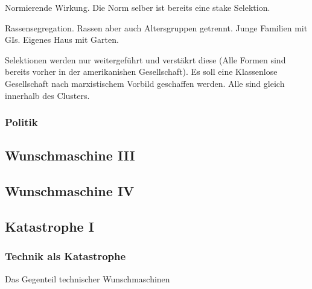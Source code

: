 \documentclass[a4paper,ngerman,11pt]{scrartcl}
\begin{document}
Normierende Wirkung. Die Norm selber ist bereits eine stake Selektion.

Rassensegregation. Rassen aber auch Altersgruppen getrennt. Junge Familien
mit GIs. Eigenes Haus mit Garten.

Selektionen werden nur weitergeführt und verstäkrt diese (Alle Formen sind
bereits vorher in der amerikanishen Gesellschaft). Es soll eine Klassenlose
Gesellschaft nach marxistischem Vorbild geschaffen werden. Alle sind gleich
innerhalb des Clusters.

\subsubsection{Politik}
\label{sec-2-4-4}

\subsection{Wunschmaschine III}
\label{sec-2-5}

\subsection{Wunschmaschine IV}
\label{sec-2-6}

\subsection{Katastrophe I}
\label{sec-2-7}

\subsubsection{Technik als Katastrophe}
\label{sec-2-7-1}

Das Gegenteil technischer Wunschmaschinen
\end{document}
